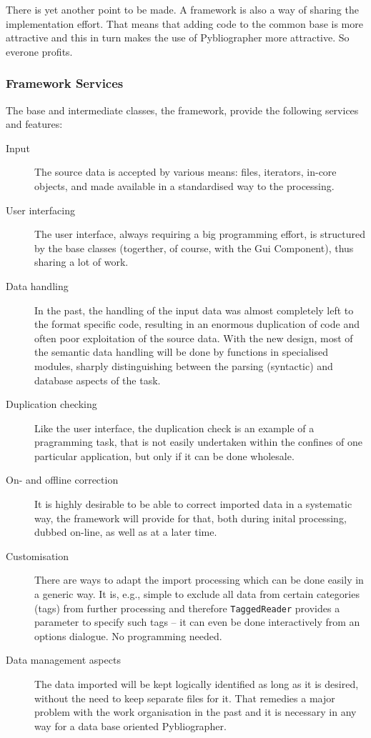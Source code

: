There is yet another point to be made. A framework is also a way of
sharing the implementation effort. That means that adding code to the
common base is more attractive  and this in turn makes the use of
Pybliographer more attractive. So  everone profits. 



\subsubsection{Framework Services}




The base and intermediate classes, the framework, provide the
following services and features: 
\begin{description}
\item[Input] The source data is accepted by various means: files,
  iterators, in-core objects, and made available in a standardised way
  to the processing. 
\item[User interfacing] The user interface, always requiring a big
  programming effort, is structured by the base classes (togerther, of
  course, with the Gui Component), thus sharing a lot of work.
\item[Data handling] In the past, the handling of the input data was
  almost completely left to the format specific code, resulting in an
  enormous duplication of code and often poor exploitation of the
  source data. With the new design, most of the semantic data handling
  will be done by functions in specialised modules, sharply
  distinguishing between the parsing (syntactic) and database aspects
  of the task.
\item[Duplication checking] Like the user interface, the duplication
  check is an example of a pragramming task, that is not easily
  undertaken within the confines of one particular application, but
  only if it can be done wholesale. 
\item[On- and offline correction] It is highly desirable to be able to
  correct imported data in a systematic way, the framework will provide
  for that, both during inital processing, dubbed on-line, as well as
  at a later time.
\item[Customisation] There are ways to adapt the import processing
  which can be done easily in a generic way.  It is, e.g., simple to
  exclude all data from certain categories (tags) from further
  processing and therefore \texttt{TaggedReader} provides a parameter
  to specify such tags -- it can even be done interactively from an
  options dialogue. No programming needed.
\item[Data management aspects] The data imported will be kept
  logically identified as long as it is desired, without the need to
  keep separate files for it. That remedies a major problem with the
  work organisation in the past and it is necessary in any way for a
  data base oriented Pybliographer.
\end{description}




